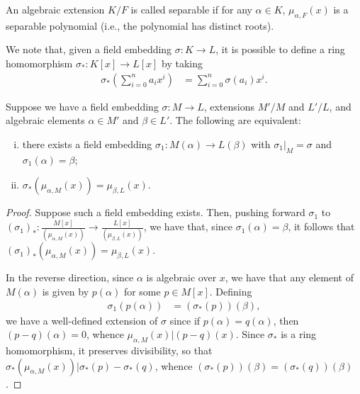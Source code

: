 \documentclass[10pt]{mypackage}
\begin{document}
\begin{definition}
  An algebraic extension $K/F$ is called separable if for any $\alpha\in K$, $\mu_{\alpha,F}(x)$ is a separable polynomial (i.e., the polynomial has distinct roots).
\end{definition}
We note that, given a field embedding $\sigma\colon K\rightarrow L$, it is possible to define a ring homomorphism $\sigma_{\ast}\colon K[x]\rightarrow L[x]$ by taking
\begin{align*}
  \sigma_{\ast}\left( \sum_{i=0}^{n}a_ix^i \right) &= \sum_{i=0}^{n}\sigma\left( a_i \right)x^{i}.
\end{align*}
\begin{theorem}
  Suppose we have a field embedding $\sigma\colon M\rightarrow L$, extensions $M'/M$ and $L'/L$, and algebraic elements $\alpha\in M'$ and $\beta\in L'$. The following are equivalent:
  \begin{enumerate}[(i)]
    \item there exists a field embedding $\sigma_{1}\colon M\left( \alpha \right)\rightarrow L\left( \beta \right)$ with $\sigma_1|_{M} = \sigma$ and $\sigma_1(\alpha) = \beta$;
    \item $\sigma_{\ast}\left( \mu_{\alpha,M}(x) \right) = \mu_{\beta,L}(x)$.
  \end{enumerate}
\end{theorem}
\begin{proof}
  Suppose such a field embedding exists. Then, pushing forward $\sigma_1$ to $\left( \sigma_1 \right)_{\ast}\colon \frac{M[x]}{\left( \mu_{\alpha,M}(x) \right)}\rightarrow \frac{L[x]}{\left( \mu_{\beta,L}(x) \right)}$, we have that, since $\sigma_1(\alpha) = \beta$, it follows that $\left( \sigma_1 \right)_{\ast}\left( \mu_{\alpha,M}(x) \right) = \mu_{\beta,L}(x)$.

  In the reverse direction, since $\alpha$ is algebraic over $x$, we have that any element of $M(\alpha)$ is given by $p(\alpha)$ for some $p\in M[x]$. Defining
  \begin{align*}
    \sigma_1\left( p\left( \alpha \right) \right) &= \left( \sigma_{\ast}(p) \right)(\beta),
  \end{align*}
  we have a well-defined extension of $\sigma$ since if $p(\alpha) = q(\alpha)$, then $\left( p-q \right)(\alpha) = 0$, whence $\mu_{\alpha,M}(x) | \left( p-q \right)(x)$. Since $\sigma_{\ast}$ is a ring homomorphism, it preserves divisibility, so that $\sigma_{\ast}\left( \mu_{\alpha,M}(x) \right) | \sigma_{\ast}(p) - \sigma_{\ast}(q)$, whence $\left( \sigma_{\ast}(p) \right)(\beta) = \left( \sigma_{\ast}(q) \right)(\beta)$.
\end{proof}
\end{document}
